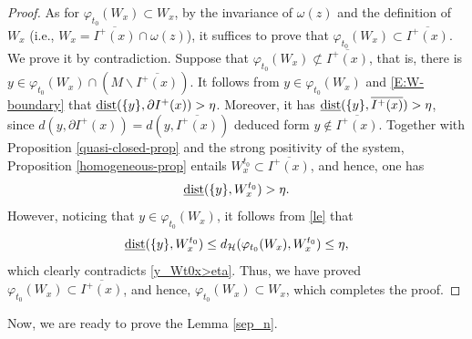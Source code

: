\documentclass[a4paper,11pt]{article}
\theoremstyle{plain}
\theoremstyle{definition}
\numberwithin{equation}{section}
\begin{document}
\begin{proof}
        As for $\varphi_{t_{0}}(W_{x})\subset W_{x}$, by the invariance of $\omega(z)$ and the definition of $W_{x}$ (i.e., $W_x= \overline{I^{+}(x)}\cap\omega(z)$), it suffices to prove that $\varphi_{t_{0}}(W_{x})\subset  \overline{I^{+}(x)}$. We prove it by contradiction. Suppose that $\varphi_{t_{0}}(W_{x})\not\subset  \overline{I^{+}(x)}$, that is, there is $y\in \varphi_{t_{0}}(W_{x})\cap (M\backslash  \overline{I^{+}(x)})$.
		It follows from $y\in \varphi_{t_{0}}(W_{x})$ and \eqref{E:W-boundary} that ${\rm \underline{dist}}(\{y\},\partial  I^{+}(x))>\eta$. Moreover, it has ${\rm \underline{dist}}(\{y\}, \overline{I^{+}(x)})>\eta$, since $d(y,\partial  I^{+}(x))=d(y,\overline{I^{+}(x)})$ deduced form $y\notin \overline{I^{+}(x)}$. Together with Proposition \ref{quasi-closed-prop} and the strong positivity of the system, Proposition \ref{homogeneous-prop} entails $W_{x}^{t_{0}}\subset \overline{I^{+}(x)}$, and hence, one has 
		\begin{equation}\label{y_Wt0x>eta}
			{\rm \underline{dist}}(\{y\}, W_{x}^{t_{0}})>\eta.
		\end{equation}
		However, noticing that $y\in \varphi_{t_{0}}(W_{x})$, it follows from \eqref{le} that $${\rm \underline{dist}}(\{y\}, W_{x}^{t_{0}})\leq d_{\mathcal{H}}(\varphi_{t_{0}}(W_{x}),W_{x}^{t_{0}})\leq\eta,$$
		which clearly contradicts \eqref{y_Wt0x>eta}.
		Thus, we have proved $\varphi_{t_{0}}(W_{x})\subset  \overline{I^{+}(x)}$, and hence, $\varphi_{t_{0}}(W_{x})\subset W_{x}$, which completes the proof.
\end{proof}

Now, we are ready to prove the Lemma \ref{sep_n}.
\end{document}
